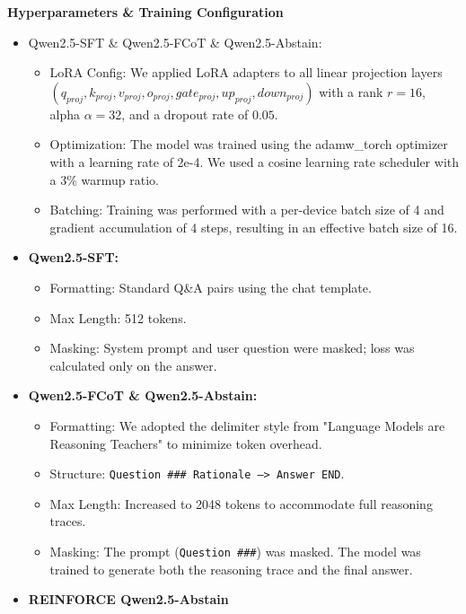 \documentclass{article}
\begin{document}
\textbf{Hyperparameters \& Training Configuration}
\begin{itemize}
    \item Qwen2.5-SFT \& Qwen2.5-FCoT \& Qwen2.5-Abstain: 
        \begin{itemize}
            \item LoRA Config: We applied LoRA adapters to all linear projection layers $(q_{proj}, k_{proj}, v_{proj}, o_{proj}, gate_{proj}, up_{proj}, down_{proj})$ with a rank $r=16$, alpha $\alpha=32$, and a dropout rate of $0.05$. 
            \item Optimization: The model was trained using the adamw\_torch optimizer with a learning rate of 2e-4. We used a cosine learning rate scheduler with a 3\% warmup ratio.
            \item Batching: Training was performed with a per-device batch size of 4 and gradient accumulation of 4 steps, resulting in an effective batch size of 16.
        \end{itemize}

    \item \textbf{Qwen2.5-SFT:}
        \begin{itemize}
            \item Formatting: Standard Q\&A pairs using the chat template.
            \item Max Length: 512 tokens.
            \item Masking: System prompt and user question were masked; loss was calculated only on the answer.
        \end{itemize}
    
    \item \textbf{Qwen2.5-FCoT \& Qwen2.5-Abstain:}
        
        \begin{itemize}
            \item Formatting: We adopted the delimiter style from "Language Models are Reasoning Teachers" to minimize token overhead. 
            \item Structure: \texttt{Question \#\#\# Rationale --> Answer END}.
            \item Max Length: Increased to 2048 tokens to accommodate full reasoning traces.
            \item Masking: The prompt (\texttt{Question \#\#\#}) was masked. The model was trained to generate both the reasoning trace and the final answer.
        \end{itemize}
    \item \textbf{REINFORCE Qwen2.5-Abstain}
    

\end{itemize}
\end{document}
